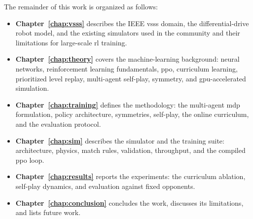 The remainder of this work is organized as follows:
\begin{itemize}
  \item \textbf{Chapter~\ref{chap:vsss}} describes the IEEE \gls{vsss} domain, the differential-drive robot model, and the existing simulators used in the community and their limitations for large-scale \gls{rl} training.
  \item \textbf{Chapter~\ref{chap:theory}} covers the machine-learning background: neural networks, reinforcement learning fundamentals, \gls{ppo}, curriculum learning, prioritized level replay, multi-agent self-play, symmetry, and \gls{gpu}-accelerated simulation.
  \item \textbf{Chapter~\ref{chap:training}} defines the methodology: the multi-agent \gls{mdp} formulation, policy architecture, symmetries, self-play, the online curriculum, and the evaluation protocol.
  \item \textbf{Chapter~\ref{chap:sim}} describes the simulator and the training suite: architecture, physics, match rules, validation, throughput, and the compiled \gls{ppo} loop.
  \item \textbf{Chapter~\ref{chap:results}} reports the experiments: the curriculum ablation, self-play dynamics, and evaluation against fixed opponents.
  \item \textbf{Chapter~\ref{chap:conclusion}} concludes the work, discusses its limitations, and lists future work.
\end{itemize}
